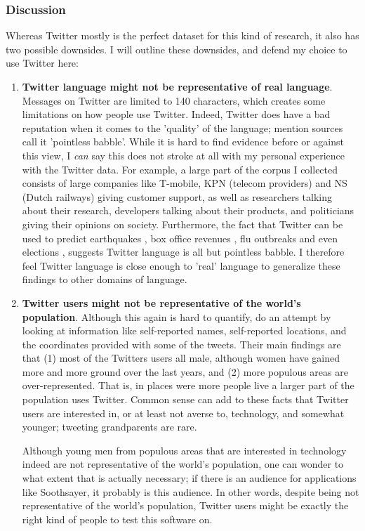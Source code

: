 \documentclass[12pt]{article}
\begin{document}
\subsubsection{Discussion}
Whereas Twitter mostly is the perfect dataset for this kind of research, it also has two possible downsides. I will outline these downsides, and defend my choice to use Twitter here:

\begin{enumerate}

\item \textbf{Twitter language might not be representative of real language}. Messages on Twitter are limited to 140 characters, which creates some limitations on how people use Twitter. Indeed, Twitter does have a bad reputation when it comes to the 'quality' of the language;  mention sources call it 'pointless babble'. While it is hard to find evidence before or against this view, I \emph{can} say this does not stroke at all with my personal experience with the Twitter data. For example, a large part of the corpus I collected consists of large companies like T-mobile, KPN (telecom providers) and NS (Dutch railways) giving customer support, as well as researchers talking about their research, developers talking about their products, and politicians giving their opinions on society. Furthermore, the fact that Twitter can be used to predict earthquakes , box office revenues , flu outbreaks  and even elections , suggests Twitter language is all but pointless babble. I therefore feel Twitter language is close enough to 'real' language to generalize these findings to other domains of language.

\item \textbf{Twitter users might not be representative of the world's population}. Although this again is hard to quantify,  do an attempt by looking at information like self-reported names, self-reported locations, and the coordinates provided with some of the tweets. Their main findings are that (1) most of the Twitters users all male, although women have gained more and more ground over the last years, and (2) more populous areas are over-represented. That is, in places were more people live a larger part of the population uses Twitter. Common sense can add to these facts that Twitter users are interested in, or at least not averse to, technology, and somewhat younger; tweeting grandparents are rare. 

Although young men from populous areas that are interested in technology indeed are not representative of the world's population, one can wonder to what extent that is actually necessary; if there is an audience for applications like Soothsayer, it probably is this audience. In other words, despite being not representative of the world's population, Twitter users might be exactly the right kind of people to test this software on.

\end{enumerate}
\end{document}
